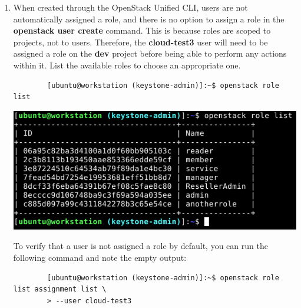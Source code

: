 \documentclass[letterpaper, 12pt]{article}
\begin{document}
\begin{enumerate}
    \begin{tipbox}
        When searching for a particular value in a long list, it is often helpful to pipe the command's output to \textbf{grep} or another string searching tool.
        For example, this command would show only the line containing \textbf{cloud-test3}:
        \begin{lstlisting}
        [ubuntu@workstation (keystone-admin)]:~$ openstack user list | \
        > grep cloud-test3
        \end{lstlisting}
        However, these labs will almost always show the full output of the \textbf{list} commands to show a snapshot of what the current state should be as you follow the instructions.
    \end{tipbox}

    \item When created through the OpenStack Unified CLI, users are not automatically assigned a role, and there is no option to assign a role in the \textbf{openstack user create} command.
    This is because roles are scoped to projects, not to users.
    Therefore, the \textbf{cloud-test3} user will need to be assigned a role on the \textbf{dev} project before being able to perform any actions within it.
    List the available roles to choose an appropriate one.
    \begin{lstlisting}
        [ubuntu@workstation (keystone-admin)]:~$ openstack role list
    \end{lstlisting}

    \begin{center}
        \includegraphics[width=\linewidth]{images/part4/step8.png}
    \end{center}

    \begin{tipbox}
        To verify that a user is not assigned a role by default, you can run the following command and note the empty output:
        \begin{lstlisting}
        [ubuntu@workstation (keystone-admin)]:~$ openstack role list assignment list \
        > --user cloud-test3
        \end{lstlisting}
    \end{tipbox}


\end{enumerate}
\end{document}
